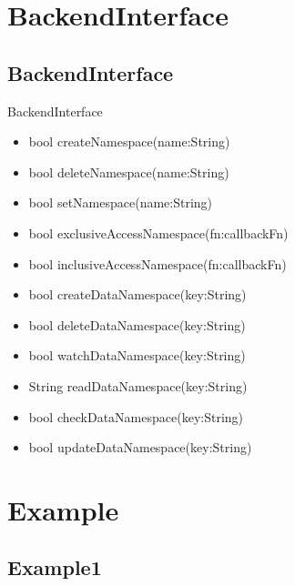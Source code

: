 \documentclass{beamer}
\begin{document}
\section {BackendInterface}
\subsection {BackendInterface}
\begin{frame}
\begin{block}{BackendInterface}
		\begin{itemize}
			\item bool \alert{createNamespace}(name:String)
			\item bool \alert{deleteNamespace}(name:String)
			\item bool \alert{setNamespace}(name:String)
			\item bool \alert{exclusiveAccessNamespace}(fn:callbackFn)
			\item bool \alert{inclusiveAccessNamespace}(fn:callbackFn)
			\item bool \alert{createDataNamespace}(key:String)
			\item bool \alert{deleteDataNamespace}(key:String)
			\item bool \alert{watchDataNamespace}(key:String)
			\item String \alert{readDataNamespace}(key:String)
			\item bool \alert{checkDataNamespace}(key:String)
			\item bool \alert{updateDataNamespace}(key:String)
		\end{itemize}
	\end{block}

\end{frame}





\section {Example}
\subsection {Example1}
\end{document}
